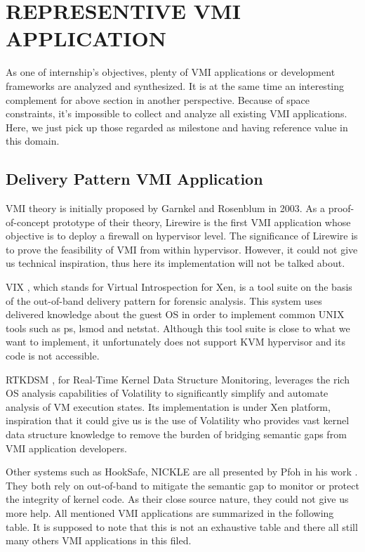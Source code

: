 \section{REPRESENTIVE VMI APPLICATION}

As one of internship’s objectives, plenty of VMI applications or development frameworks are analyzed and synthesized. It is at the same time an interesting complement for above section in another perspective. Because of space constraints, it’s impossible to collect and analyze all existing VMI applications. Here, we just pick up those regarded as milestone and having reference value in this domain.

\subsection{Delivery Pattern VMI Application}

VMI theory is initially proposed by Garnkel and Rosenblum  \citep{Reference1} in 2003. As a proof-of-concept prototype of their theory, Lirewire  \citep{Reference1} is the first VMI application whose objective is to deploy a firewall on hypervisor level. The significance of Lirewire is to prove the feasibility of VMI from within hypervisor. However, it could not give us technical inspiration, thus here its implementation will not be talked about.

VIX  \citep{Reference10}, which stands for Virtual Introspection for Xen, is a tool suite on the basis of the out-of-band delivery pattern for forensic analysis. This system uses delivered knowledge about the guest OS in order to implement common UNIX tools such as ps, lsmod and netstat. Although this tool suite is close to what we want to implement, it unfortunately does not support KVM hypervisor and its code is not accessible.

RTKDSM  \citep{Reference3}, for Real-Time Kernel Data Structure Monitoring, leverages the rich OS analysis capabilities of Volatility  \citep{Reference13} to significantly simplify and automate analysis of VM execution states. Its implementation is under Xen platform, inspiration that it could give us is the use of Volatility who provides vast kernel data structure knowledge to remove the burden of bridging semantic gaps from VMI application developers.

Other systems such as HookSafe, NICKLE are all presented by Pfoh in his work  \citep{Reference7}. They both rely on out-of-band to mitigate the semantic gap to monitor or protect the integrity of kernel code. As their close source nature, they could not give us more help. All mentioned VMI applications are summarized in the following table. It is supposed to note that this is not an exhaustive table and there all still many others VMI applications in this filed.

